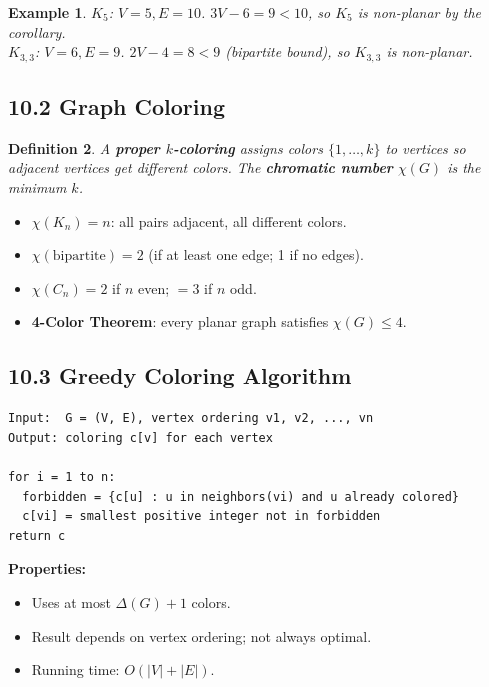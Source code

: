\documentclass[11pt]{article}
\newtheorem{definition}{Definition}[section]
\newtheorem{example}[definition]{Example}
\begin{document}
\begin{example}
$K_5$: $V=5,E=10$. $3V-6=9<10$, so $K_5$ is non-planar by the corollary.\\
$K_{3,3}$: $V=6,E=9$. $2V-4=8<9$ (bipartite bound), so $K_{3,3}$ is non-planar.
\end{example}

\subsection*{10.2 Graph Coloring}

\begin{definition}
A \textbf{proper $k$-coloring} assigns colors $\{1,\ldots,k\}$ to vertices so adjacent vertices get different colors. The \textbf{chromatic number} $\chi(G)$ is the minimum $k$.
\end{definition}

\begin{tcolorbox}[keybox={Key chromatic numbers}]
\begin{itemize}[nosep]
  \item $\chi(K_n)=n$: all pairs adjacent, all different colors.
  \item $\chi(\text{bipartite})=2$ (if at least one edge; 1 if no edges).
  \item $\chi(C_n)=2$ if $n$ even; $=3$ if $n$ odd.
  \item \textbf{4-Color Theorem}: every planar graph satisfies $\chi(G)\le4$.
\end{itemize}
\end{tcolorbox}

\subsection*{10.3 Greedy Coloring Algorithm}

\begin{lstlisting}[caption={Greedy graph coloring}]
Input:  G = (V, E), vertex ordering v1, v2, ..., vn
Output: coloring c[v] for each vertex

for i = 1 to n:
  forbidden = {c[u] : u in neighbors(vi) and u already colored}
  c[vi] = smallest positive integer not in forbidden
return c
\end{lstlisting}

\textbf{Properties:}
\begin{itemize}[nosep]
  \item Uses at most $\Delta(G)+1$ colors.
  \item Result depends on vertex ordering; not always optimal.
  \item Running time: $O(|V|+|E|)$.
\end{itemize}
\end{document}
